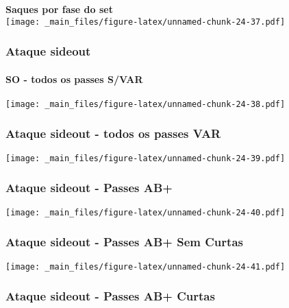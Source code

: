 \documentclass[
]{book}
\begin{document}
\textbf{Saques por fase do set}\\
\texttt{[image: \_main\_files/figure-latex/unnamed-chunk-24-37.pdf]} \pagebreak

\subsubsection{Ataque sideout}\label{ataque-sideout-2}

\paragraph*{SO - todos os passes S/VAR}\label{so---todos-os-passes-svar-2}

\texttt{[image: \_main\_files/figure-latex/unnamed-chunk-24-38.pdf]}

\subsubsection*{Ataque sideout - todos os passes VAR}\label{ataque-sideout---todos-os-passes-var-2}

\texttt{[image: \_main\_files/figure-latex/unnamed-chunk-24-39.pdf]}

\subsubsection{Ataque sideout - Passes AB+}\label{ataque-sideout---passes-ab-2}

\texttt{[image: \_main\_files/figure-latex/unnamed-chunk-24-40.pdf]}

\subsubsection*{Ataque sideout - Passes AB+ Sem Curtas}\label{ataque-sideout---passes-ab-sem-curtas-2}

\texttt{[image: \_main\_files/figure-latex/unnamed-chunk-24-41.pdf]}

\subsubsection*{Ataque sideout - Passes AB+ Curtas}\label{ataque-sideout---passes-ab-curtas-2}
\end{document}
